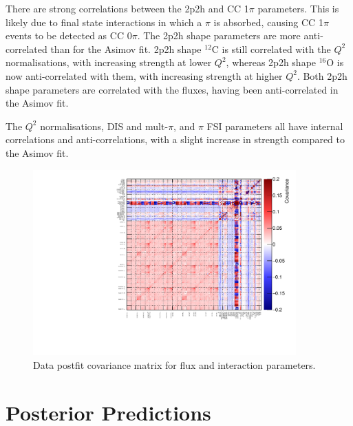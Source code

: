 There are strong correlations between the 2p2h and CC 1$\pi$ parameters. This is likely due to final state interactions in which a $\pi$ is absorbed, causing CC 1$\pi$ events to be detected as CC 0$\pi$. The 2p2h shape parameters are more anti-correlated than for the Asimov fit. 2p2h shape $^{12}$C is still correlated with the $Q^2$ normalisations, with increasing strength at lower $Q^2$, whereas 2p2h shape $^{16}$O is now anti-correlated with them, with increasing strength at higher $Q^2$. Both 2p2h shape parameters are correlated with the fluxes, having been anti-correlated in the Asimov fit.

The $Q^2$ normalisations, DIS and mult-$\pi$, and $\pi$ FSI parameters all have internal correlations and anti-correlations, with a slight increase in strength compared to the Asimov fit. 

\begin{figure}
\centering
\includegraphics*[width=0.9\textwidth,clip]{figs/datpostfitcov}
\caption{Data postfit covariance matrix for flux and interaction parameters.}\label{fig:datpostfitcov}
\end{figure}

\section{Posterior Predictions}\label{sec:respostpred}

